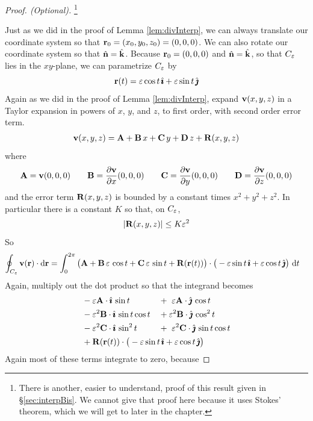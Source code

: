 \begin{proof}[Proof. (Optional)]\footnote{There is another, easier to understand, proof of this result given in \S\ref{sec:interpBis}. We cannot give that proof here because it uses Stokes' theorem, which we will get to
later in the chapter.}

Just as we did in the proof of Lemma \ref{lem:divInterp}, we can always
translate our coordinate system so that $\mathbf{r}_0=(x_0,y_0,z_0) = (0,0,0)$. 
We can also rotate our coordinate system so that $\hat{\mathbf{n}}=\hat{\mathbf{k}}$. 
Because $\mathbf{r}_0=(0,0,0)$ and $\hat{\mathbf{n}}=\hat{\mathbf{k}}$, so that $C_\varepsilon$ lies in the 
$xy$-plane, we can parametrize $C_\varepsilon$ by
\begin{equation*}
\mathbf{r}(t) =\varepsilon\cos t\,\hat{\pmb{\imath}} +\varepsilon\sin t\,\hat{\pmb{\jmath}}
\end{equation*}
Again as we did in the proof of Lemma \ref{lem:divInterp}, 
expand $\mathbf{v}(x,y,z)$ in a Taylor expansion in powers of $x$, $y$, and $z$,
to first order, with second order error term.
\begin{align*}
\mathbf{v}(x,y,z) = \mathbf{A} + \mathbf{B}\,x +\mathbf{C}\,y +\mathbf{D}\, z +\mathbf{R}(x,y,z)
\end{align*}
where
\begin{align*}
\mathbf{A}=\mathbf{v}(0,0,0) \qquad
\mathbf{B}=\frac{\partial \mathbf{v}}{\partial x}(0,0,0) \qquad
\mathbf{C}=\frac{\partial \mathbf{v}}{\partial y}(0,0,0) \qquad
\mathbf{D}=\frac{\partial \mathbf{v}}{\partial z}(0,0,0) 
\end{align*}
and the error term $\mathbf{R}(x,y,z)$ is bounded by a constant times
$x^2+y^2+z^2$. In particular there is a constant $K$ so that, on $C_\varepsilon$,
\begin{equation*}
|\mathbf{R}(x,y,z)|\le K\varepsilon^2
\end{equation*}
So
\begin{align*}
\oint_{C_\varepsilon} \mathbf{v}(\mathbf{r})\cdot \mathrm{d}\mathbf{r}
&=\int_0^{2\pi} \big(\mathbf{A} + \mathbf{B}\,\varepsilon\,\cos t +\mathbf{C}\,\varepsilon\,\sin t 
       +\mathbf{R}(\mathbf{r}(t))\big)
        \cdot \big(-\varepsilon\sin t\,\hat{\pmb{\imath}} +\varepsilon\cos t\,\hat{\pmb{\jmath}}\big)\ \mathrm{d}t
\end{align*}
Again, multiply out the dot product so that the integrand becomes
\begin{alignat*}{5}
& -\veps\vA\cdot\hi\,\sin t
&&+\ \veps\vA\cdot\hj\,\cos t \\ 
&-\veps^2\vB\cdot\hi\,\sin t\cos t
&&+\veps^2\vB\cdot\hj\,\cos^2t \\ 
&-\veps^2\vC\cdot\hi\,\sin^2 t 
&&+\ \veps^2\vC\cdot\hj\,\sin t\cos t \\ 
&+\vR(\vr(t))\cdot \big(-\veps\sin t\,\hi +\veps\cos t\,\hj\big)\hidewidth
\end{alignat*}
Again most of these terms integrate to zero, because

\end{proof}
